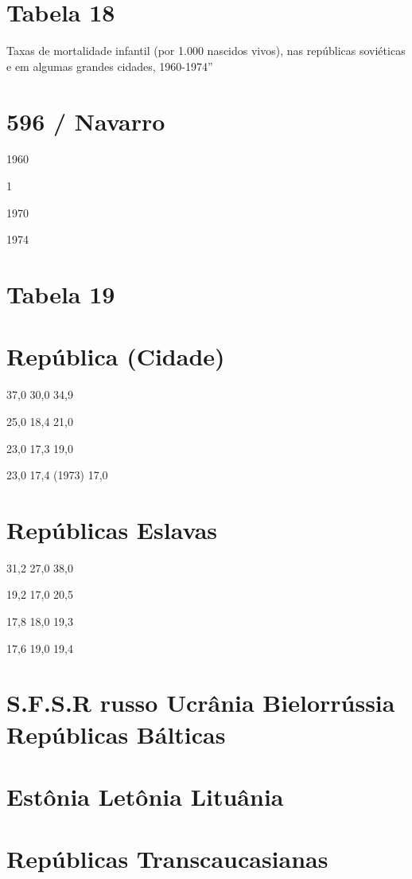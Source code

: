 {{{\section{Tabela 18}
 \par 
Taxas de mortalidade infantil (por {\color{blue}1}.{\color{blue}000} nascidos vivos), nas repúblicas soviéticas e em algumas grandes cidades, 1960-1974”
 \par 
\section{596 / Navarro}
 \par 
1960
 \par 
1%
 \par 
1970
 \par 
1974
 \par 
\section{Tabela 19}
 \par 
\section{República (Cidade)}
 \par 
37,0 30,0 34,9
 \par 
25,0 18,4 21,0
 \par 
23,0 17,3 19,0
 \par 
23,0 17,4 (1973) 17,0
 \par 
\section{Repúblicas Eslavas}
 \par 
31,2 27,0 38,0
 \par 
19,2 17,0 20,5
 \par 
17,8 18,0 19,3
 \par 
17,6 19,0 19,4
 \par 
\section{S.F.S.R russo Ucrânia Bielorrússia Repúblicas Bálticas}
 \par 
\section{Estônia Letônia Lituânia}
 \par 
\section{Repúblicas Transcaucasianas}
 \par 
}}}
